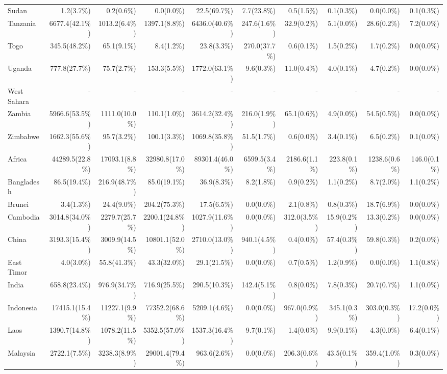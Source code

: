 \begin{scriptsize}
\begin{landscape}
\begin{center}
\begin{longtable}[ht]{lrrrrrrrrr}
			Sudan&1.2(3.7\%)&0.2(0.6\%)&0.0(0.0\%)&22.5(69.7\%)&7.7(23.8\%)&0.5(1.5\%)&0.1(0.3\%)&0.0(0.0\%)&0.1(0.3\%)\\
			Tanzania&6677.4(42.1\%)&1013.2(6.4\%)&1397.1(8.8\%)&6436.0(40.6\%)&247.6(1.6\%)&32.9(0.2\%)&5.1(0.0\%)&28.6(0.2\%)&7.2(0.0\%)\\
			Togo&345.5(48.2\%)&65.1(9.1\%)&8.4(1.2\%)&23.8(3.3\%)&270.0(37.7\%)&0.6(0.1\%)&1.5(0.2\%)&1.7(0.2\%)&0.0(0.0\%)\\
			Uganda&777.8(27.7\%)&75.7(2.7\%)&153.3(5.5\%)&1772.0(63.1\%)&9.6(0.3\%)&11.0(0.4\%)&4.0(0.1\%)&4.7(0.2\%)&0.0(0.0\%)\\
			West Sahara&-&-&-&-&-&-&-&-&-\\
			Zambia&5966.6(53.5\%)&1111.0(10.0\%)&110.1(1.0\%)&3614.2(32.4\%)&216.0(1.9\%)&65.1(0.6\%)&4.9(0.0\%)&54.5(0.5\%)&0.0(0.0\%)\\
			Zimbabwe&1662.3(55.6\%)&95.7(3.2\%)&100.1(3.3\%)&1069.8(35.8\%)&51.5(1.7\%)&0.6(0.0\%)&3.4(0.1\%)&6.5(0.2\%)&0.1(0.0\%)\\\hline
			Africa&44289.5(22.8\%)&17093.1(8.8\%)&32980.8(17.0\%)&89301.4(46.0\%)&6599.5(3.4\%)&2186.6(1.1\%)&223.8(0.1\%)&1238.6(0.6\%)&146.0(0.1\%)\\\hline
			Bangladesh&86.5(19.4\%)&216.9(48.7\%)&85.0(19.1\%)&36.9(8.3\%)&8.2(1.8\%)&0.9(0.2\%)&1.1(0.2\%)&8.7(2.0\%)&1.1(0.2\%)\\
			Brunei&3.4(1.3\%)&24.4(9.0\%)&204.2(75.3\%)&17.5(6.5\%)&0.0(0.0\%)&2.1(0.8\%)&0.8(0.3\%)&18.7(6.9\%)&0.0(0.0\%)\\
			Cambodia&3014.8(34.0\%)&2279.7(25.7\%)&2200.1(24.8\%)&1027.9(11.6\%)&0.0(0.0\%)&312.0(3.5\%)&15.9(0.2\%)&13.3(0.2\%)&0.0(0.0\%)\\
			China&3193.3(15.4\%)&3009.9(14.5\%)&10801.1(52.0\%)&2710.0(13.0\%)&940.1(4.5\%)&0.4(0.0\%)&57.4(0.3\%)&59.8(0.3\%)&0.2(0.0\%)\\
			East Timor&4.0(3.0\%)&55.8(41.3\%)&43.3(32.0\%)&29.1(21.5\%)&0.0(0.0\%)&0.7(0.5\%)&1.2(0.9\%)&0.0(0.0\%)&1.1(0.8\%)\\
			India&658.8(23.4\%)&976.9(34.7\%)&716.9(25.5\%)&290.5(10.3\%)&142.4(5.1\%)&0.8(0.0\%)&7.8(0.3\%)&20.7(0.7\%)&1.1(0.0\%)\\
			Indonesia&17415.1(15.4\%)&11227.1(9.9\%)&77352.2(68.6\%)&5209.1(4.6\%)&0.0(0.0\%)&967.0(0.9\%)&345.1(0.3\%)&303.0(0.3\%)&17.2(0.0\%)\\
			Laos&1390.7(14.8\%)&1078.2(11.5\%)&5352.5(57.0\%)&1537.3(16.4\%)&9.7(0.1\%)&1.4(0.0\%)&9.9(0.1\%)&4.3(0.0\%)&6.4(0.1\%)\\
			Malaysia&2722.1(7.5\%)&3238.3(8.9\%)&29001.4(79.4\%)&963.6(2.6\%)&0.0(0.0\%)&206.3(0.6\%)&43.5(0.1\%)&359.4(1.0\%)&0.3(0.0\%)\\

\end{longtable}
\end{center}
\end{landscape}
\end{scriptsize}
